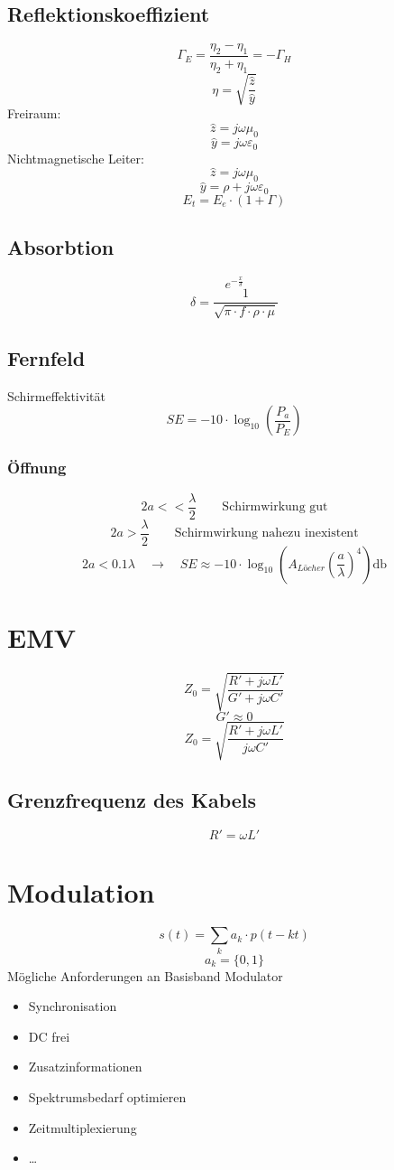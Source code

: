 \documentclass[a4paper, 10pt, fleqn]{article}
\begin{document}
\subsection{Reflektionskoeffizient}
\[ \Gamma_E = \frac{\eta_2 - \eta_1}{\eta_2 + \eta_1} = -\Gamma_H \]
\[ \eta = \sqrt{\frac{\hat{z}}{\hat{y}}} \]
Freiraum: 
\[ \hat{z} = j \omega\mu_0 \]
\[ \hat{y} = j \omega \varepsilon_0 \]
Nichtmagnetische Leiter:
\[ \hat{z} = j \omega\mu_0 \]
\[ \hat{y} = \rho + j \omega \varepsilon_0 \]
\[ E_t = E_e \cdot (1 + \Gamma) \]

\subsection{Absorbtion}
\[ e^{-\frac{x}{\delta}} \]
\[ \delta = \frac{1}{\sqrt{\pi \cdot f \cdot \rho \cdot \mu}} \]

\subsection{Fernfeld}
Schirmeffektivität
\[ SE = - 10 \cdot \log_{10}\left(\frac{P_a}{P_E}\right) \]

\subsubsection{Öffnung}
\[ 2a << \frac{\lambda}{2} \qquad \text{Schirmwirkung gut} \]
\[ 2a > \frac{\lambda}{2} \qquad \text{Schirmwirkung nahezu inexistent} \]
\[ 2a < 0.1 \lambda \quad \rightarrow \quad SE \approx -10 \cdot \log_{10}\left(A_{Löcher}\left(\frac{a}{\lambda}\right)^4\right) \si{\decibel} \]

\section{EMV}
\[ Z_0 = \sqrt{\frac{R' + j \omega L'}{G' + j \omega C'}} \]
\[ G' \approx 0 \]
\[ Z_0 = \sqrt{\frac{R' + j \omega L'}{j  \omega C'}} \]

\subsection{Grenzfrequenz des Kabels}
\[ R' = \omega L' \]

\section{Modulation}
\[ s(t) = \sum\limits_k a_k \cdot p(t-kt) \]
\[ a_k = \{0, 1\} \]
Mögliche Anforderungen an Basisband Modulator
\begin{itemize}
    \item Synchronisation
    \item DC frei
    \item Zusatzinformationen
    \item Spektrumsbedarf optimieren
    \item Zeitmultiplexierung
    \item \ldots
\end{itemize}
\end{document}
